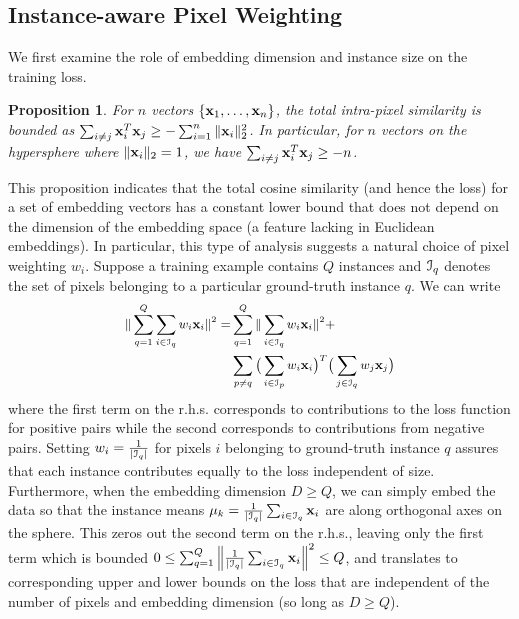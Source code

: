 \documentclass[10pt,twocolumn,letterpaper]{article}
\def\x{{\bf x}}
\newtheorem{propositions}{Proposition}
\begin{document}
\subsection{Instance-aware Pixel Weighting}
We first examine the role of embedding dimension and instance size on the
training loss.
\begin{propositions}
\label{theorem:ObjLowerBound}
For $n$ vectors $\{\x_1, \dots, \x_n\}$, the total intra-pixel similarity is
bounded as $\sum_{i\neq j} \x_i^T\x_j \ge -\sum_{i=1}^n  \Vert \x_i \Vert_2^2$.
In particular, for $n$ vectors on the hypersphere where $\Vert\x_i\Vert_2 = 1$,
we have $\sum_{i\neq j} \x_i^T\x_j \ge -n$.
\end{propositions}
This proposition indicates that the total cosine similarity (and hence the loss)
for a set of embedding vectors has a constant lower bound that does not depend
on the dimension of the embedding space (a feature lacking in Euclidean
embeddings). In particular, this type of analysis suggests a natural choice of
pixel weighting $w_i$. Suppose a training example contains $Q$ instances and
${\cal I}_q$ denotes the set of pixels belonging to a particular ground-truth
instance $q$.  We can write
\begin{equation}
\small
\begin{split}
\| \sum_{q=1}^Q \sum_{i \in {\cal I}_q} w_i \x_i \|^2 = &
\sum_{q=1}^Q \| \sum_{i \in {\cal I}_q} w_i \x_i \|^2 + \\
&\sum_{p \neq q} \big(\sum_{i \in {\cal I}_p} w_i \x_i \big)^T \big(\sum_{j \in {\cal I}_q} w_j \x_j \big)
\end{split}
\nonumber
\end{equation}%
where the first term on the r.h.s. corresponds to contributions to the loss
function for positive pairs while the second corresponds to contributions
from negative pairs. Setting $w_i = \frac{1}{\vert {\cal I}_q\vert}$ for pixels $i$
belonging to ground-truth instance $q$ assures that each instance contributes
equally to the loss independent of size. Furthermore, when the embedding
dimension $D \geq Q$, we can simply embed the data so that the instance means
$ \mu_k = \frac{1}{\vert {\cal I}_q\vert} \sum_{i \in {\cal I}_q} \x_i $
are along orthogonal axes on the sphere. This zeros out the second term on
the r.h.s., leaving only the first term which is bounded
$
0 \leq \sum_{q=1}^Q \left\| \frac{1}{\vert {\cal I}_q \vert} \sum_{i \in {\cal I}_q} \x_i \right\|^2 \leq Q$,
and translates to corresponding upper and lower bounds on the loss
that are independent of the number of pixels and embedding dimension
(so long as $D \geq Q$).
\end{document}
